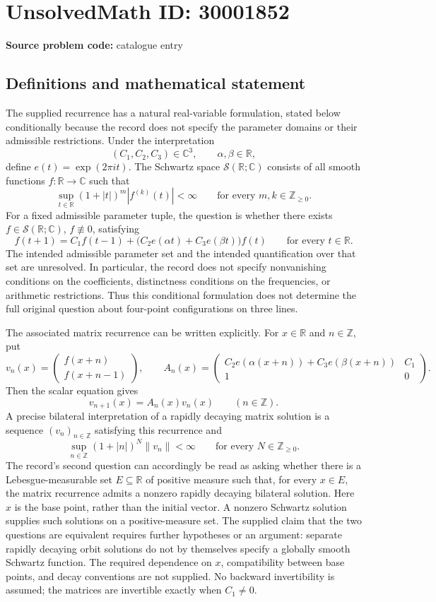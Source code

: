 \documentclass[11pt]{article}
\newcommand{\Z}{\mathbb{Z}}
\newcommand{\R}{\mathbb{R}}
\newcommand{\C}{\mathbb{C}}
\begin{document}
\section*{UnsolvedMath ID: 30001852}
\textbf{Source problem code:} catalogue entry
\subsection{Definitions and mathematical statement}
The supplied recurrence has a natural real-variable formulation, stated below conditionally because the record does not specify the parameter domains or their admissible restrictions. Under the interpretation
\[
(C_1,C_2,C_3)\in\C^3,\qquad \alpha,\beta\in\R,
\]
define \(e(t)=\exp(2\pi i t)\). The Schwartz space \(\mathcal S(\R;\C)\) consists of all smooth functions \(f:\R\to\C\) such that
\[
\sup_{t\in\R}(1+|t|)^m|f^{(k)}(t)|<\infty
\qquad\text{for every }m,k\in\Z_{\geq0}.
\]
For a fixed admissible parameter tuple, the question is whether there exists \(f\in\mathcal S(\R;\C)\), \(f\not\equiv0\), satisfying
\[
f(t+1)=C_1f(t-1)+\bigl(C_2e(\alpha t)+C_3e(\beta t)\bigr)f(t)
\qquad\text{for every }t\in\R.
\]
The intended admissible parameter set and the intended quantification over that set are unresolved. In particular, the record does not specify nonvanishing conditions on the coefficients, distinctness conditions on the frequencies, or arithmetic restrictions. Thus this conditional formulation does not determine the full original question about four-point configurations on three lines.

The associated matrix recurrence can be written explicitly. For \(x\in\R\) and \(n\in\Z\), put
\[
v_n(x)=\begin{pmatrix}f(x+n)\\ f(x+n-1)\end{pmatrix},\qquad
A_n(x)=\begin{pmatrix}
C_2e(\alpha(x+n))+C_3e(\beta(x+n))&C_1\\
1&0
\end{pmatrix}.
\]
Then the scalar equation gives
\[
v_{n+1}(x)=A_n(x)v_n(x)\qquad(n\in\Z).
\]
A precise bilateral interpretation of a rapidly decaying matrix solution is a sequence \((v_n)_{n\in\Z}\) satisfying this recurrence and
\[
\sup_{n\in\Z}(1+|n|)^N\|v_n\|<\infty
\qquad\text{for every }N\in\Z_{\geq0}.
\]
The record's second question can accordingly be read as asking whether there is a Lebesgue-measurable set \(E\subseteq\R\) of positive measure such that, for every \(x\in E\), the matrix recurrence admits a nonzero rapidly decaying bilateral solution. Here \(x\) is the base point, rather than the initial vector. A nonzero Schwartz solution supplies such solutions on a positive-measure set. The supplied claim that the two questions are equivalent requires further hypotheses or an argument: separate rapidly decaying orbit solutions do not by themselves specify a globally smooth Schwartz function. The required dependence on \(x\), compatibility between base points, and decay conventions are not supplied. No backward invertibility is assumed; the matrices are invertible exactly when \(C_1\ne0\).
\end{document}
